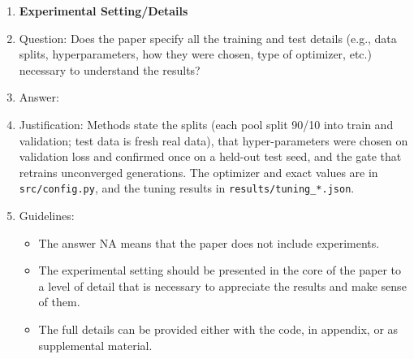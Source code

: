 \begin{enumerate}
\item {\bf Experimental Setting/Details}
    \item[] Question: Does the paper specify all the training and test details (e.g., data splits, hyperparameters, how they were chosen, type of optimizer, etc.) necessary to understand the results?
    \item[] Answer: \answerYes{}
    \item[] Justification: Methods state the splits (each pool split 90/10 into train and validation; test data is fresh real data), that hyper-parameters were chosen on validation loss and confirmed once on a held-out test seed, and the gate that retrains unconverged generations. The optimizer and exact values are in \texttt{src/config.py}, and the tuning results in \texttt{results/tuning\_*.json}.
    \item[] Guidelines:
    \begin{itemize}
        \item The answer NA means that the paper does not include experiments.
        \item The experimental setting should be presented in the core of the paper to a level of detail that is necessary to appreciate the results and make sense of them.
        \item The full details can be provided either with the code, in appendix, or as supplemental material.
    \end{itemize}


\end{enumerate}
